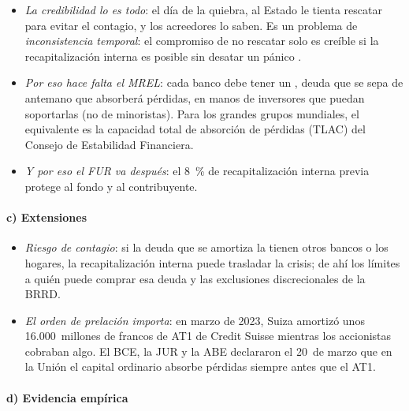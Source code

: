 \documentclass[11pt]{article}
\begin{document}
\begin{itemize}
\item \emph{La credibilidad lo es todo}: el día de la quiebra, al Estado le tienta rescatar para evitar el contagio, y los acreedores lo saben. Es un problema de \emph{inconsistencia temporal}: el compromiso de no rescatar solo es creíble si la recapitalización interna es posible sin desatar un pánico .
\item \emph{Por eso hace falta el MREL}: cada banco debe tener un , deuda que se sepa de antemano que absorberá pérdidas, en manos de inversores que puedan soportarlas (no de minoristas). Para los grandes grupos mundiales, el equivalente es la capacidad total de absorción de pérdidas (TLAC) del Consejo de Estabilidad Financiera.
\item \emph{Y por eso el FUR va después}: el 8~\% de recapitalización interna previa protege al fondo y al contribuyente.
\end{itemize}

\paragraph{c) Extensiones}

\begin{itemize}
\item \emph{Riesgo de contagio}: si la deuda que se amortiza la tienen otros bancos o los hogares, la recapitalización interna puede trasladar la crisis; de ahí los límites a quién puede comprar esa deuda y las exclusiones discrecionales de la BRRD.
\item \emph{El orden de prelación importa}: en marzo de 2023, Suiza amortizó unos 16.000~millones de francos de AT1 de Credit Suisse mientras los accionistas cobraban algo. El BCE, la JUR y la ABE declararon el 20~de marzo que en la Unión el capital ordinario absorbe pérdidas siempre antes que el AT1\nocite{BCE2023DeclaracionAT1}.
\end{itemize}

\paragraph{d) Evidencia empírica}
\end{document}
